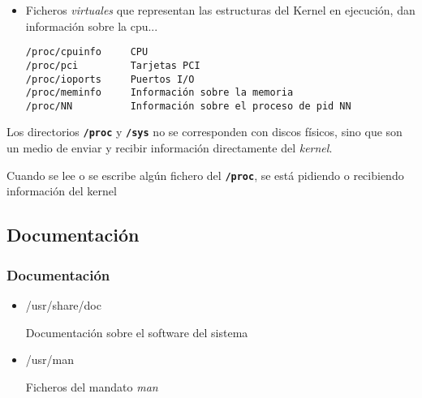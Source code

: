 \documentclass[ucs]{beamer}
\begin{document}


\begin{frame}[fragile]

\begin{itemize}
  
\item 
Ficheros \emph{virtuales} que representan las estructuras del Kernel
en ejecución,  dan información sobre la cpu...


  \begin{footnotesize}
  \begin{verbatim}
/proc/cpuinfo     CPU
/proc/pci         Tarjetas PCI
/proc/ioports     Puertos I/O
/proc/meminfo     Información sobre la memoria
/proc/NN          Información sobre el proceso de pid NN
  \end{verbatim}
  \end{footnotesize}

\end{itemize}
  


Los directorios \texttt{\textbf{/proc}} y \texttt{\textbf{/sys}} no se corresponden
con discos físicos, sino que son un medio de enviar y recibir información directamente del \emph{kernel}.

Cuando se   lee o se escribe algún fichero del \texttt{\textbf{/proc}}, se está
pidiendo o recibiendo información del kernel
\end{frame}



\subsection{Documentación}

\begin{frame}[fragile]
\frametitle{Documentación}
\begin{itemize}

\item

/usr/share/doc

Documentación sobre el software del sistema
\item
/usr/man

Ficheros del mandato \emph{man}

\end{itemize}
\end{frame}
\end{document}
